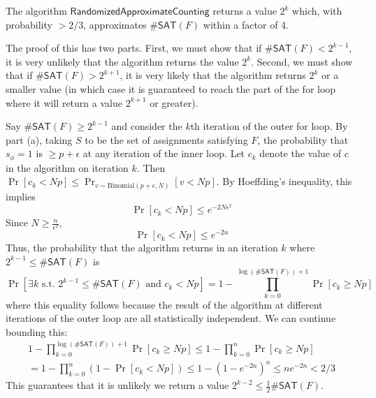 \documentclass{article}
\begin{document}
The algorithm $\mathsf{RandomizedApproximateCounting}$ returns a value $2^k$ which,
with probability $> 2/3$, approximates $\#\mathsf{SAT}(F)$ within a factor of 4.

The proof of this has two parts.
First, we must show that if $\#\mathsf{SAT}(F) < 2^{k-1}$,
it is very unlikely that the algorithm returns the value $2^k$.
Second, we must show that if $\#\mathsf{SAT}(F) > 2^{k+1}$,
it is very likely that the algorithm returns $2^k$
or a smaller value (in which case it is guaranteed to reach the part of
the for loop where it will return a value $2^{k+1}$ or greater).

Say $\#\mathsf{SAT}(F) \geq 2^{k-1}$  and consider the $k$th iteration of the
outer for loop.
By part (a), taking $S$ to be the set of assignments satisfying $F$,
the probability that $s_\phi = 1$ is $\geq p + \epsilon$
at any iteration of the inner loop.
Let $c_k$ denote the value of $c$ in the algorithm on iteration $k$.
Then $\Pr[c_k < Np] \leq \Pr_{v \sim \text{Binomial}(p + \epsilon, N)}[v < Np]$.
By Hoeffding's inequality, this implies
$$
\Pr[c_k < Np] \leq e^{-2N\epsilon^2}
$$
Since $N \geq \frac{n}{\epsilon^2}$,
$$
\Pr[c_k < Np] \leq e^{-2n}
$$
Thus, the probability that the algorithm returns in an iteration $k$
where $2^{k-1} \leq \#\mathsf{SAT}(F)$ is
$$
\Pr[\exists k \text{ s.t. }2^{k-1} \leq \#\mathsf{SAT}(F) \text{ and } c_k < Np] = 1 - \prod_{k=0}^{\log(\#\mathsf{SAT}(F)) + 1}{\Pr[c_k \geq Np]}
$$
where this equality follows because the result of the algorithm at different iterations of the outer loop are all statistically independent.
We can continue bounding this:
\begin{multline*}
1 - \prod_{k=0}^{\log(\#\mathsf{SAT}(F)) + 1}{\Pr[c_k \geq Np]}
\leq 1 - \prod_{k = 0}^n{\Pr[c_k \geq Np]} \\
= 1 - \prod_{k = 0}^n{(1 - \Pr[c_k < Np])} 
\leq 1 - (1 - e^{-2n})^n
\leq ne^{-2n}
< 2/3
\end{multline*}
This guarantees that it is unlikely we return a value $2^{k-2} \leq \frac{1}{2}\#\mathsf{SAT}(F)$.
\end{document}
